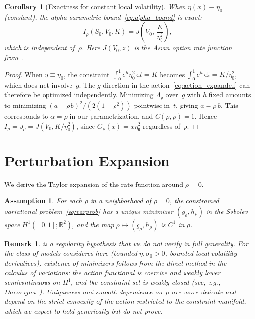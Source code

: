 \documentclass[12pt]{article}
\newtheorem{corollary}[theorem]{Corollary}
\newtheorem{remark}[theorem]{Remark}
\newtheorem{assumption}{Assumption}
\newcommand{\R}{\mathbb{R}}
\newcommand{\dd}{\mathrm{d}}
\begin{document}
\begin{corollary}[Exactness for constant local volatility]\label{cor:exactconst}
When $\eta(x)\equiv\eta_0$ (constant), the alpha-parametric bound~\eqref{eq:alpha_bound}
is exact:
\begin{equation}\label{eq:exact_const}
I_\rho(S_0,V_0,K) = J\!\left(V_0,\,\frac{K}{\eta_0^2}\right),
\end{equation}
which is independent of~$\rho$. Here $J(V_0,z)$ is the Asian option rate function
from~\cite{PZ2023}.
\end{corollary}
\begin{proof}
When $\eta\equiv\eta_0$, the constraint~$\int_0^1 e^{h}\eta_0^2\,\dd t = K$ becomes
$\int_0^1 e^{h}\,\dd t = K/\eta_0^2$, which does not involve~$g$. The $g$-direction
in the action~\eqref{eq:action_expanded} can therefore be optimized independently.
Minimizing $\Lambda_\rho$ over~$g$ with $h$ fixed amounts to minimizing
$(a-\rho\,b)^2/(2(1-\rho^2))$ pointwise in~$t$, giving $a = \rho\,b$. This
corresponds to $\alpha=\rho$ in our parametrization, and $C(\rho,\rho)=1$. Hence
$I_\rho = J_\rho = J(V_0,K/\eta_0^2)$, since $G_\rho(x)=x\eta_0^2$ regardless
of~$\rho$.
\end{proof}


\section{Perturbation Expansion}\label{sec:perturbation}

We derive the Taylor expansion of the rate function around $\rho=0$.

\begin{assumption}\label{ass:regularity}
For each $\rho$ in a neighborhood of $\rho=0$, the constrained variational
problem~\eqref{eq:varprob} has a unique minimizer $(g_\rho,h_\rho)$ in the Sobolev
space $H^1([0,1];\R^2)$, and the map $\rho\mapsto(g_\rho,h_\rho)$ is $C^1$ in $\rho$.
\end{assumption}

\begin{remark}\label{rem:regularity}
 is a regularity hypothesis that we do not verify in full
generality. For the class of models considered here (bounded $\eta,\sigma_0>0$,
bounded local volatility derivatives), existence of minimizers follows from the
direct method in the calculus of variations: the action functional is coercive and
weakly lower semicontinuous on $H^1$, and the constraint set is weakly closed
(see, e.g., Dacorogna~\cite{Dacorogna}). Uniqueness and smooth dependence on~$\rho$
are more delicate and depend on the strict convexity of the action restricted to the
constraint manifold, which we expect to hold generically but do not prove.
\end{remark}
\end{document}
